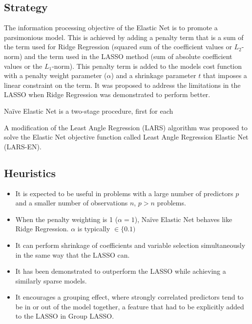 \subsection{Strategy}
The information processing objective of the Elastic Net is to promote a parsimonious model.
This is achieved by adding a penalty term that is a sum of the term used for Ridge Regression (squared sum of the coefficient values or $L_2$-norm) and the term used in the LASSO method (sum of absolute coefficient values or the $L_1$-norm). This penalty term is added to the models cost function with a penalty weight parameter ($\alpha$) and a shrinkage parameter $t$ that imposes a linear constraint on the term. 
It was proposed to address the limitations in the LASSO when Ridge Regression was demonstrated to perform better. 

Na\"ive Elastic Net is a two-stage procedure, first for each 

A modification of the Least Angle Regression (LARS) algorithm was proposed to solve the Elastic Net objective function called Least Angle Regression Elastic Net (LARS-EN).

\subsection{Heuristics}

\begin{itemize}
	\item It is expected to be useful in problems with a large number of predictors $p$ and a smaller number of observations $n$, $p>n$ problems.
	\item When the penalty weighting is 1 ($\alpha=1$), Na\"ive Elastic Net behaves like Ridge Regression. $\alpha$ is typically $\in \{0.1)$
	\item It can perform shrinkage of coefficients and variable selection simultaneously in the same way that the LASSO can.
	\item It has been demonstrated to outperform the LASSO while achieving a similarly sparse models.
	\item It encourages a grouping effect, where strongly correlated predictors tend to be in or out of the model together, a feature that had to be explicitly added to the LASSO in Group LASSO.
\end{itemize}

